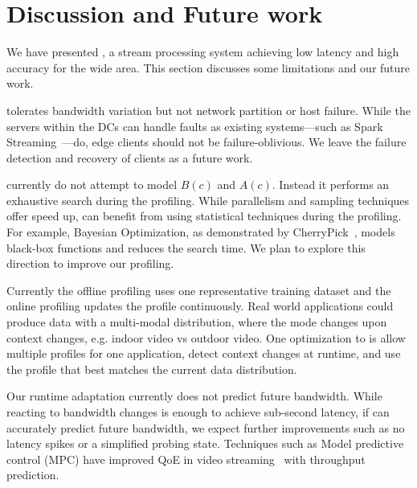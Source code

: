 \section{Discussion and Future work}
\label{sec:discussion}

We have presented \sysname{}, a stream processing system achieving low latency
and high accuracy for the wide area. This section discusses some limitations and
our future work.

 \sysname{} tolerates bandwidth
variation but not network partition or host failure. While the servers within
the DCs can handle faults as existing systems---such as Spark
Streaming~\cite{zaharia2013discretized}---do, edge clients should not be
failure-oblivious. We leave the failure detection and recovery of clients as a
future work.

 \sysname{} currently do not attempt to model $B(c)$
and $A(c)$. Instead it performs an exhaustive search during the profiling. While
parallelism and sampling techniques offer speed up, \sysname{} can benefit from
using statistical techniques during the profiling. For example, Bayesian
Optimization, as demonstrated by CherryPick~\cite{alipourfard2017cherrypick},
models black-box functions and reduces the search time. We plan to explore this
direction to improve our profiling.


 Currently the offline profiling uses one
representative training dataset and the online profiling updates the profile
continuously. Real world applications could produce data with a multi-modal
distribution, where the mode changes upon context changes, e.g. indoor video vs
outdoor video. One optimization to \sysname{} is allow multiple profiles for one
application, detect context changes at runtime, and use the profile that best
matches the current data distribution.

 Our runtime adaptation currently does not
predict future bandwidth. While reacting to bandwidth changes is enough to
achieve sub-second latency, if \sysname{} can accurately predict future
bandwidth, we expect further improvements such as no latency spikes or a
simplified probing state. Techniques such as Model predictive control (MPC) have
improved QoE in video streaming~\cite{yin2015control} with throughput
prediction.

